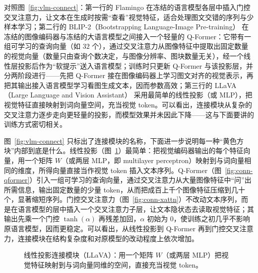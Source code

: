 对照图~\ref{fig:vlm-connect}：第一行的 Flamingo\cite{flamingo} 在冻结的语言模型各层中插入门控交叉注意力，让文本在生成时按需“查看”视觉特征，适合处理图文交错的序列与少样本学习；第二行的 BLIP-2（Bootstrapping Language-Image Pre-training）\cite{blip2} 在冻结的图像编码器与冻结的大语言模型之间接入一个轻量的 Q-Former：它带有一组可学习的查询向量（如 $32$ 个），通过交叉注意力从图像特征中提取出固定数量的视觉向量（数量只由查询个数决定，与图像分辨率、图块数量无关），经一个线性层投影后作为“软提示”送入语言模型；训练时只更新 Q-Former 与该投影层，并分两阶段进行——先把 Q-Former 接在图像编码器上学习图文对齐的视觉表示，再把其输出接入语言模型学习看图生成文本，因而参数高效；第三行的 LLaVA（Large Language and Vision Assistant）\cite{llava} 采用最简单的线性投影（或 MLP），把视觉特征直接映射到词向量空间，充当视觉 token。可以看出，连接模块从复杂的交叉注意力逐步走向更轻量的投影，而模型效果并未因此下降——这与下面要讲的训练方式密切相关。

图~\ref{fig:vlm-connect} 只标出了连接模块的名称，下面进一步说明每一种“黄色方块”内部到底是什么。线性投影（图~\ref{fig:conn-proj}）最简单：把视觉编码器输出的每个特征向量，用一个矩阵 $W$（或两层 MLP，即 multilayer perceptron）映射到与词向量相同的维度，所得向量直接当作视觉 token 插入文本序列。Q-Former（图~\ref{fig:conn-qformer}）引入一组可学习的查询向量，通过交叉注意力从大量图像特征中“问”出所需信息，输出固定数量的少量 token，从而把成百上千个图像特征压缩到几十个，显著缩短序列。门控交叉注意力（图~\ref{fig:conn-xattn}）不改动文本序列，而是在语言模型的层中插入一个交叉注意力子层，让文本隐状态去读取视觉特征；其输出先乘一个门控 $\tanh(\alpha)$ 再残差加回，$\alpha$ 初始为 $0$，使训练之初几乎不影响原语言模型，因而更稳定。可以看出，从线性投影到 Q-Former 再到门控交叉注意力，连接模块在结构复杂度和对原模型的改动程度上依次增加。

\begin{figure}[htbp]
  \centering
  \caption{线性投影连接模块（LLaVA）：用一个矩阵 $W$（或两层 MLP）把视觉特征映射到与词向量同维的空间，直接充当视觉 token。}
  \label{fig:conn-proj}
\end{figure}

